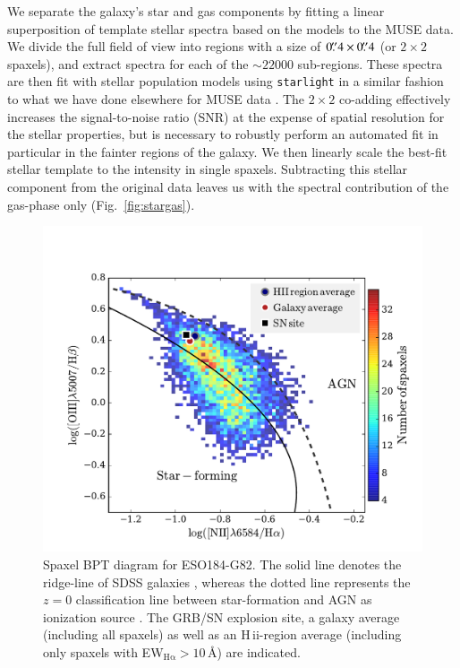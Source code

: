 \documentclass[traditabstract, referee]{aa}
\newcommand{\farc}{\hbox{$.\!\!^{\prime\prime}$}}
\newcommand{\hii}{\mbox{H\,{\sc ii}}}
\begin{document}
We separate the galaxy's star and gas components by fitting a linear superposition of template stellar spectra based on the \citet{2003MNRAS.344.1000B} models to the MUSE data. We divide the full field of view into regions with a size of $0\farc{4}\times0\farc{4}$ (or $2 \times 2$ spaxels), and extract spectra for each of the $\sim22000$ sub-regions. These spectra are then fit with stellar population models using \texttt{starlight} \citep{2005MNRAS.358..363C, 2009RMxAC..35..127C} in a similar fashion to what we have done elsewhere for MUSE data \citep{2016MNRAS.455.4087G, 2016arXiv160703446K, 2016arXiv160900013P}. The $2\times2$ co-adding effectively increases the signal-to-noise ratio (SNR) at the expense of spatial resolution for the stellar properties, but is necessary to robustly perform an automated fit in particular in the fainter regions of the galaxy. We then linearly scale the best-fit stellar template to the intensity in single spaxels. Subtracting this stellar component from the original data leaves us with the spectral contribution of the gas-phase only (Fig.~\ref{fig:stargas}).

\begin{figure}
\begin{center}
  \includegraphics[width=0.99\linewidth]{Figs/MUSE_SN1998bw_BPT.pdf}
\caption{Spaxel BPT diagram for ESO184-G82. The solid line denotes the ridge-line of SDSS galaxies \citep{2008MNRAS.385..769B}, whereas the dotted line represents the $z=0$ classification line between star-formation and AGN as ionization source \citep{2013ApJ...774..100K}. The GRB/SN explosion site, a galaxy average (including all spaxels) as well as an \hii-region average (including only spaxels with EW$_{\mathrm{H\alpha}}>10$\,\AA) are indicated.}
\label{fig:BPT}
\end{center}
\end{figure}
\end{document}
